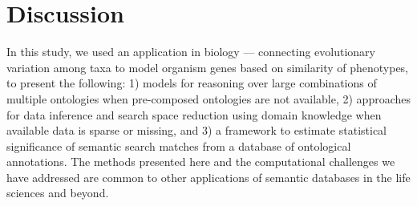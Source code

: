 \documentclass{article}
\begin{document}

\section{Discussion}


In this study, we used an application in biology — connecting evolutionary variation among taxa to model organism genes based on similarity of phenotypes, to present the following: 1) models for reasoning over large combinations of multiple ontologies when pre-composed ontologies are not available, 2) approaches for data inference and search space reduction using domain knowledge when available data is sparse or missing, and 3) a framework to estimate statistical significance of semantic search matches from a database of ontological annotations. The methods presented here and the computational challenges we have addressed are common to other applications of semantic databases in the life sciences and beyond.

\end{document}
